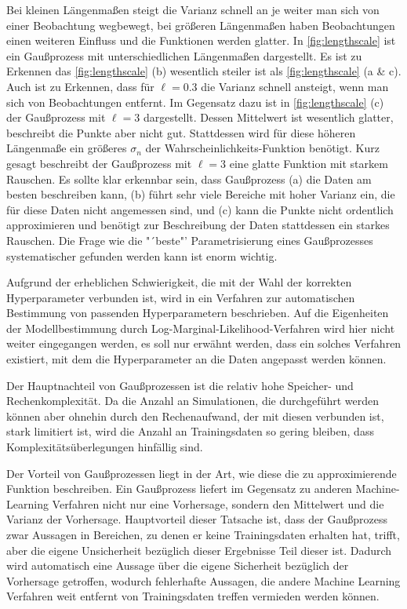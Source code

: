 Bei kleinen Längenmaßen steigt die Varianz schnell an je weiter man sich von einer Beobachtung wegbewegt, bei größeren Längenmaßen haben Beobachtungen einen weiteren Einfluss und die Funktionen werden glatter.
In \cref{fig:lengthscale} ist ein Gaußprozess mit unterschiedlichen Längenmaßen dargestellt.
Es ist zu Erkennen das \cref{fig:lengthscale} (b) wesentlich steiler ist als \cref{fig:lengthscale} (a \& c).
Auch ist zu Erkennen, dass für $\ell=0.3$ die Varianz schnell ansteigt, wenn man sich von Beobachtungen entfernt.
Im Gegensatz dazu ist in \cref{fig:lengthscale} (c) der Gaußprozess mit $\ell = 3$ dargestellt. 
Dessen Mittelwert ist wesentlich glatter, beschreibt die Punkte aber nicht gut. 
Stattdessen wird für diese höheren Längenmaße ein größeres $\sigma_n$ der Wahrscheinlichkeits-Funktion benötigt. 
Kurz gesagt beschreibt der Gaußprozess mit $\ell=3$ eine glatte Funktion mit starkem Rauschen.
Es sollte klar erkennbar sein, dass Gaußprozess (a) die Daten am besten beschreiben kann, (b) führt sehr viele Bereiche mit hoher Varianz ein, die für diese Daten nicht angemessen sind, und (c) kann die Punkte nicht ordentlich approximieren und benötigt zur Beschreibung der Daten stattdessen ein starkes Rauschen.
Die Frage wie die "´beste"' Parametrisierung eines Gaußprozesses systematischer gefunden werden kann ist enorm wichtig.

Aufgrund der erheblichen Schwierigkeit, die mit der Wahl der korrekten Hyperparameter verbunden ist, wird in \cite{Rasmussen.2008} ein Verfahren zur automatischen Bestimmung von passenden Hyperparametern beschrieben.
Auf die Eigenheiten der Modellbestimmung durch Log-Marginal-Likelihood-Verfahren wird hier nicht weiter eingegangen werden, es soll nur erwähnt werden, dass ein solches Verfahren existiert, mit dem die Hyperparameter an die Daten angepasst werden können.

Der Hauptnachteil von Gaußprozessen ist die relativ hohe Speicher- und Rechenkomplexität. 
Da die Anzahl an Simulationen, die durchgeführt werden können aber ohnehin durch den Rechenaufwand, der mit diesen verbunden ist, stark limitiert ist, wird die Anzahl an Trainingsdaten so gering bleiben, dass Komplexitätsüberlegungen hinfällig sind.

Der Vorteil von Gaußprozessen liegt in der Art, wie diese die zu approximierende Funktion beschreiben.
Ein Gaußprozess liefert im Gegensatz zu anderen Machine-Learning Verfahren nicht nur eine Vorhersage, sondern den Mittelwert und die Varianz der Vorhersage.
Hauptvorteil dieser Tatsache ist, dass der Gaußprozess zwar Aussagen in Bereichen, zu denen er keine Trainingsdaten erhalten hat, trifft, aber die eigene Unsicherheit bezüglich dieser Ergebnisse Teil dieser ist.
Dadurch wird automatisch eine Aussage über die eigene Sicherheit bezüglich der Vorhersage getroffen, wodurch fehlerhafte Aussagen, die andere Machine Learning Verfahren weit entfernt von Trainingsdaten treffen vermieden werden können.

